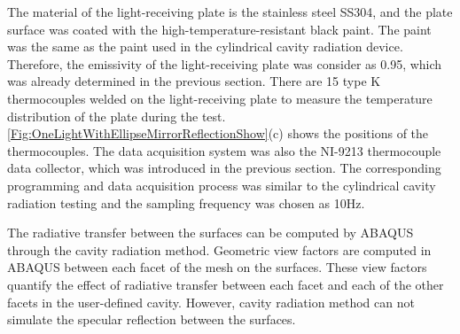 
The material of the light-receiving plate is the stainless steel SS304, and the plate surface was coated with the high-temperature-resistant black paint. The paint was the same as the paint used in the cylindrical cavity radiation device. Therefore, the emissivity of the light-receiving plate was consider as 0.95, which was already determined in the previous section.
There are 15 type K thermocouples welded on the light-receiving plate to measure the temperature distribution of the plate during the test.
\ref{Fig:OneLightWithEllipseMirrorReflectionShow}(c) shows the positions of the thermocouples. 
The data acquisition system was also the NI-9213 thermocouple data collector, which was introduced in the previous section. The corresponding programming and data acquisition process was similar to the cylindrical cavity radiation testing and the sampling frequency was chosen as 10Hz.

The radiative transfer between the surfaces can be computed by ABAQUS through the cavity radiation method. Geometric view factors are computed in ABAQUS between each facet of the mesh on the surfaces. These view factors quantify the effect of radiative transfer between each facet and each of the other facets in the user-defined cavity. However, cavity radiation method can not simulate the specular reflection between the surfaces. 

